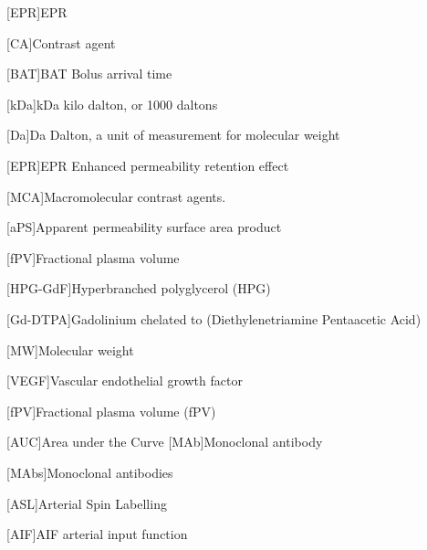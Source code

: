 \begin{acronym}
[EPR]{EPR}%

[CA]{Contrast agent}

[BAT]{BAT Bolus arrival time}

[kDa]{kDa kilo dalton, or 1000 daltons}

[Da]{Da Dalton, a unit of measurement for molecular weight}

[EPR]{EPR Enhanced permeability retention effect}

[MCA]{Macromolecular contrast agents.}

[aPS]{Apparent permeability surface area product}%

[fPV]{Fractional plasma volume}

[HPG-GdF]{Hyperbranched polyglycerol (HPG)}%

[Gd-DTPA]{Gadolinium chelated to (Diethylenetriamine Pentaacetic Acid)}%

[MW]{Molecular weight}

[VEGF]{Vascular endothelial growth factor}

[fPV]{Fractional plasma volume (fPV)}

[AUC]{Area under the Curve}%
[MAb]{Monoclonal antibody}

[MAbs]{Monoclonal antibodies}

[ASL]{Arterial Spin Labelling}

[AIF]{AIF arterial input function}


\end{acronym}
